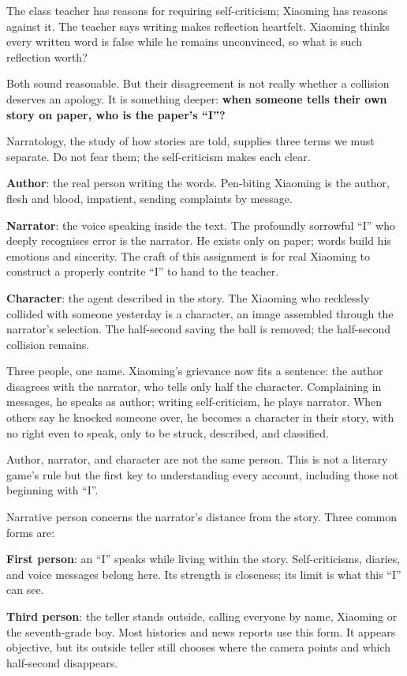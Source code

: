 The class teacher has reasons for requiring self-criticism; Xiaoming has reasons against it. The teacher says writing makes reflection heartfelt. Xiaoming thinks every written word is false while he remains unconvinced, so what is such reflection worth?

Both sound reasonable. But their disagreement is not really whether a collision deserves an apology. It is something deeper: \textbf{when someone tells their own story on paper, who is the paper's ``I''?}

Narratology, the study of how stories are told, supplies three terms we must separate. Do not fear them; the self-criticism makes each clear.

\textbf{Author}: the real person writing the words. Pen-biting Xiaoming is the author, flesh and blood, impatient, sending complaints by message.

\textbf{Narrator}: the voice speaking inside the text. The profoundly sorrowful ``I'' who deeply recognises error is the narrator. He exists only on paper; words build his emotions and sincerity. The craft of this assignment is for real Xiaoming to construct a properly contrite ``I'' to hand to the teacher.

\textbf{Character}: the agent described in the story. The Xiaoming who recklessly collided with someone yesterday is a character, an image assembled through the narrator's selection. The half-second saving the ball is removed; the half-second collision remains.

Three people, one name. Xiaoming's grievance now fits a sentence: the author disagrees with the narrator, who tells only half the character. Complaining in messages, he speaks as author; writing self-criticism, he plays narrator. When others say he knocked someone over, he becomes a character in their story, with no right even to speak, only to be struck, described, and classified.

Author, narrator, and character are not the same person. This is not a literary game's rule but the first key to understanding every account, including those not beginning with ``I''.

Narrative person concerns the narrator's distance from the story. Three common forms are:

\textbf{First person}: an ``I'' speaks while living within the story. Self-criticisms, diaries, and voice messages belong here. Its strength is closeness; its limit is what this ``I'' can see.

\textbf{Third person}: the teller stands outside, calling everyone by name, Xiaoming or the seventh-grade boy. Most histories and news reports use this form. It appears objective, but its outside teller still chooses where the camera points and which half-second disappears.

